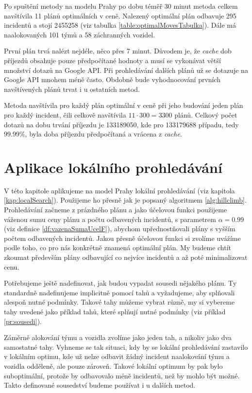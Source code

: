 Po spuštění metody na modelu Prahy po dobu téměř 30 minut metoda celkem navštívila 11 plánů optimálních v ceně.
Nalezený optimální plán odbavuje 295 incidentů a stojí 2455258 (viz tabulka \ref{table:optimalMovesTabulka}).
Dále má naalokovaných 101 týmů a 58 záchranných vozidel.

První plán trvá nalézt nejdéle, něco přes 7 minut. Důvodem je, že \textit{cache} dob příjezdů obsahuje pouze předpočítané hodnoty a musí se vykonávat větší množství
dotazů na Google API.
Při prohledávání dalších plánů už se dotazuje na Google API mnohem méně často.
Obdobně bude vyhodnocování prvních navštívených plánů trvat i u ostatních metod.

Metoda navštívila pro každý plán optimální v ceně při jeho budování jeden plán pro každý incident, čili celkově navštívila $11 \cdot 300 = 3300$ plánů.
Celkový počet dotazů na dobu trvání příjezdu je 133189050, kde pro 133179688 případu, tedy $99.99\%$, byla doba příjezdu předpočítaná a vrácena z \textit{cache}.

\section{Aplikace lokálního prohledávání}

V této kapitole aplikujeme na model Prahy lokální prohledávání (viz kapitola \ref{kap:localSearch}).
Použijeme ho přesně jak je popsaný algoritmem \ref{alg:hillclimb}.
Prohledávání začneme z prázdného plánu a jako účelovou funkci použijeme váženou sumu ceny plánu a počtu odbavených incidentů, s parametrem $\alpha = 0.99$ (viz definice \ref{df:vazenaSumaUcelF}),
abychom upřednostňovali plány s vyšším počtem odbavených incidentů.
Jakou přesně účelovou funkci si zvolíme uvážíme podle toho, co pro nás konkrétně znamená optimální plán. My budeme chtít zkoumat především plány odbavující co nejvíce incidentů a až poté minimalizovat cenu.

Potřebujeme ještě nadefinovat, jak budou vypadat sousedi nějakého plánu.
Ty standardně nadefinujeme implicitně pomocí tahů a vyžadujeme, aby splňovali alespoň nutné podmínky.
Takové tahy můžeme vybrat různě, my si vybereme tahy uvedené jako příklad tahů, které splňují nutné podmínky (viz příklad \ref{pr:sousedi}).

Záměrně alokování týmu a vozidla zvolíme jako jeden tah, a nikoliv jako dva samostatné tahy. Vyhneme se tak situaci, kdy by se lokální prohledávání zastavilo v lokálním optimu, 
kde už nelze odbavit žádný incident naalokování týmu a vozidla odděleně, ale pouze zároveň. Takové lokální optimum by pak bylo suboptimální, protože by odbavovalo méně incidentů, než by mohlo být možné.
Takto definované sousedství budeme používat i u dalších metod.

